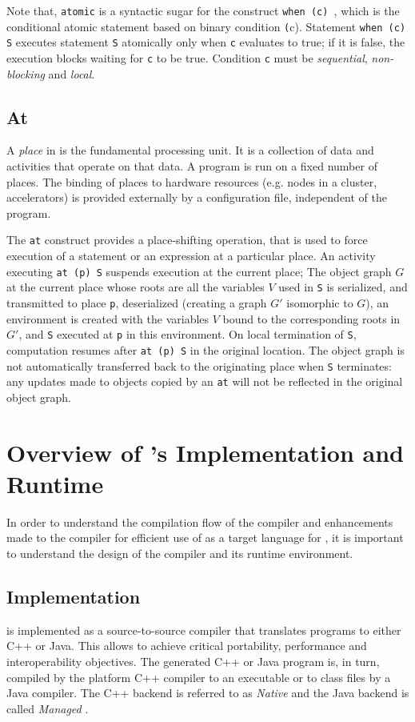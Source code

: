 Note that, \texttt{atomic} is a syntactic sugar for the construct \texttt{when
(c) }, which is the conditional atomic statement based on binary 
condition \texttt(c). Statement \texttt{when (c) S} executes statement
\texttt{S} atomically only when \texttt{c} evaluates to true; if it is false,
the execution blocks waiting for \texttt{c} to be true. Condition \texttt{c}
must be \emph{sequential}, \emph{non-blocking} and \emph{local}.

\subsection{At}\label{sec:places} A \emph{place} in \xten is the fundamental
processing unit. It is a collection of data and activities that operate on that
data. A program is run on a fixed number of places. The binding of places to
hardware resources (e.g. nodes in a cluster, accelerators) is provided
externally by a configuration file, independent of the program. 

The \texttt{at} construct provides a place-shifting operation, that is used to force
execution of a statement or an expression at a particular place. An activity
executing \texttt{at (p) S} suspends execution at the current place; The object
graph $G$ at the current place whose roots are all the variables $V$ used in
\texttt{S}
is serialized, and transmitted to place \texttt{p}, deserialized 
(creating a graph $G'$
isomorphic to $G$), an environment is created with the variables $V$ bound to
the corresponding roots in $G'$, and \texttt{S} executed at \texttt{p} in this 
environment. On
local termination of \texttt{S}, computation 
resumes after \texttt{at (p) S} in the original
location. The object graph is not automatically transferred back to the
originating place when \texttt{S} terminates: any updates made to 
objects copied by an \texttt{at}
will not be reflected in the original object graph. 

\section{Overview of \xten's Implementation and Runtime}

In order to understand the compilation flow of the \mixten compiler and
enhancements made to the \xten compiler for efficient use of \xten as a target
language for \matlab, it is important to understand the design of the \xten
compiler and its runtime environment.  

\subsection{\xten Implementation}
\xten is implemented as a source-to-source compiler that translates \xten
programs to either C++ or Java. This allows \xten to achieve critical
portability, performance and interoperability objectives. The generated C++ or
Java program is, in turn, compiled by the platform C++ compiler to an executable
or to class files by a Java compiler. The C++ backend is referred to as
\emph{Native \xten} and the Java backend is called \emph{Managed \xten}. 

